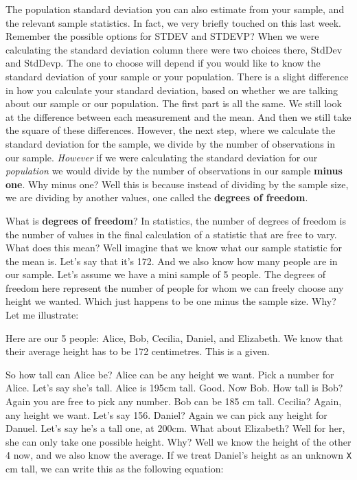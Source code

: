 \documentclass[]{book}
\theoremstyle{definition}
\theoremstyle{definition}
\theoremstyle{definition}
\theoremstyle{remark}
\begin{document}
The population standard deviation you can also estimate from your
sample, and the relevant sample statistics. In fact, we very briefly
touched on this last week. Remember the possible options for STDEV and
STDEVP? When we were calculating the standard deviation column there
were two choices there, StdDev and StdDevp. The one to choose will
depend if you would like to know the standard deviation of your sample
or your population. There is a slight difference in how you calculate
your standard deviation, based on whether we are talking about our
sample or our population. The first part is all the same. We still look
at the difference between each measurement and the mean. And then we
still take the square of these differences. However, the next step,
where we calculate the standard deviation for the sample, we divide by
the number of observations in our sample. \emph{However} if we were
calculating the standard deviation for our \emph{population} we would
divide by the number of observations in our sample \textbf{minus one}.
Why minus one? Well this is because instead of dividing by the sample
size, we are dividing by another values, one called the \textbf{degrees
of freedom}.

What is \textbf{degrees of freedom}? In statistics, the number of
degrees of freedom is the number of values in the final calculation of a
statistic that are free to vary. What does this mean? Well imagine that
we know what our sample statistic for the mean is. Let's say that it's
172. And we also know how many people are in our sample. Let's assume we
have a mini sample of 5 people. The degrees of freedom here represent
the number of people for whom we can freely choose any height we wanted.
Which just happens to be one minus the sample size. Why? Let me
illustrate:

Here are our 5 people: Alice, Bob, Cecilia, Daniel, and Elizabeth. We
know that their average height has to be 172 centimetres. This is a
given.

So how tall can Alice be? Alice can be any height we want. Pick a number
for Alice. Let's say she's tall. Alice is 195cm tall. Good. Now Bob. How
tall is Bob? Again you are free to pick any number. Bob can be 185 cm
tall. Cecilia? Again, any height we want. Let's say 156. Daniel? Again
we can pick any height for Danuel. Let's say he's a tall one, at 200cm.
What about Elizabeth? Well for her, she can only take one possible
height. Why? Well we know the height of the other 4 now, and we also
know the average. If we treat Daniel's height as an unknown \texttt{X}
cm tall, we can write this as the following equation:
\end{document}
